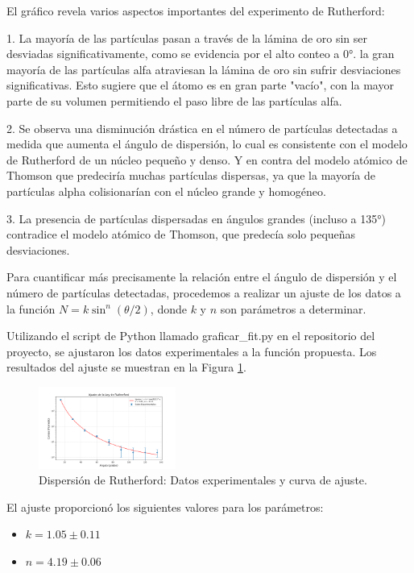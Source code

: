 \documentclass[twocolumn,a4paper,11pt]{scrartcl}
\begin{document}
El gráfico revela varios aspectos importantes del experimento de Rutherford:

1. La mayoría de las partículas pasan a través de la lámina de oro sin ser desviadas significativamente, como se evidencia por el alto conteo a 0°. la gran mayoría de las partículas alfa atraviesan la lámina de oro sin sufrir desviaciones significativas. Esto sugiere que el átomo es en gran parte "vacío", con la mayor parte de su volumen permitiendo el paso libre de las partículas alfa.

2. Se observa una disminución drástica en el número de partículas detectadas a medida que aumenta el ángulo de dispersión, lo cual es consistente con el modelo de Rutherford de un núcleo pequeño y denso. Y en contra del modelo atómico de Thomson que predeciría muchas partículas dispersas, ya que la mayoría de partículas alpha colisionarían con el núcleo grande y homogéneo.

3. La presencia de partículas dispersadas en ángulos grandes (incluso a 135°) contradice el modelo atómico de Thomson, que predecía solo pequeñas desviaciones.

Para cuantificar más precisamente la relación entre el ángulo de dispersión y el número de partículas detectadas, procedemos a realizar un ajuste de los datos a la función $N = k \sin^n (\theta/2)$, donde $k$ y $n$ son parámetros a determinar.

Utilizando el script de Python llamado graficar\_fit.py en el repositorio del proyecto, se ajustaron los datos experimentales a la función propuesta. Los resultados del ajuste se muestran en la Figura \ref{fig:rutherford_fit}.

\begin{figure}[h]
\centering
\includegraphics[width=0.4\textwidth]{data_fit.png}
\caption{Dispersión de Rutherford: Datos experimentales y curva de ajuste.}
\label{fig:rutherford_fit}
\end{figure}

El ajuste proporcionó los siguientes valores para los parámetros:

\begin{itemize}
    \item $k = 1.05 \pm 0.11$
    \item $n = 4.19 \pm 0.06$
\end{itemize}
\end{document}
